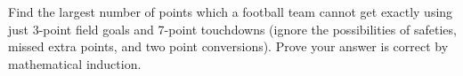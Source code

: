 \begin{questions}

\question Find the largest number of points which a football team cannot get exactly using just 3-point field goals and 7-point touchdowns (ignore the possibilities of safeties, missed extra points, and two point conversions).  Prove your answer is correct by mathematical induction.

%  
%  
%    
%    
%    


\end{questions}
